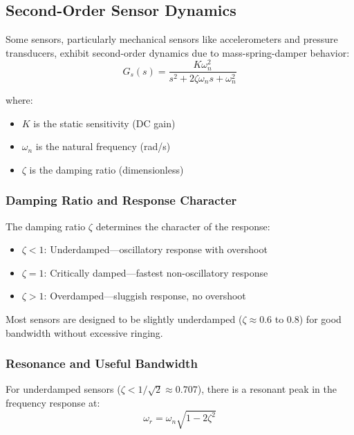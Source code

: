 \subsection{Second-Order Sensor Dynamics}

Some sensors, particularly mechanical sensors like accelerometers and pressure transducers, exhibit second-order dynamics due to mass-spring-damper behavior:
\begin{equation}
G_s(s) = \frac{K\omega_n^2}{s^2 + 2\zeta\omega_n s + \omega_n^2}
\label{eq:second_order_sensor}
\end{equation}

where:
\begin{itemize}
    \item $K$ is the static sensitivity (DC gain)
    \item $\omega_n$ is the natural frequency (rad/s)
    \item $\zeta$ is the damping ratio (dimensionless)
\end{itemize}

\subsubsection{Damping Ratio and Response Character}

The damping ratio $\zeta$ determines the character of the response:
\begin{itemize}
    \item $\zeta < 1$: Underdamped---oscillatory response with overshoot
    \item $\zeta = 1$: Critically damped---fastest non-oscillatory response
    \item $\zeta > 1$: Overdamped---sluggish response, no overshoot
\end{itemize}

Most sensors are designed to be slightly underdamped ($\zeta \approx 0.6$ to $0.8$) for good bandwidth without excessive ringing.

\subsubsection{Resonance and Useful Bandwidth}

For underdamped sensors ($\zeta < 1/\sqrt{2} \approx 0.707$), there is a resonant peak in the frequency response at:
\begin{equation}
\omega_r = \omega_n\sqrt{1 - 2\zeta^2}
\label{eq:resonant_freq}
\end{equation}

